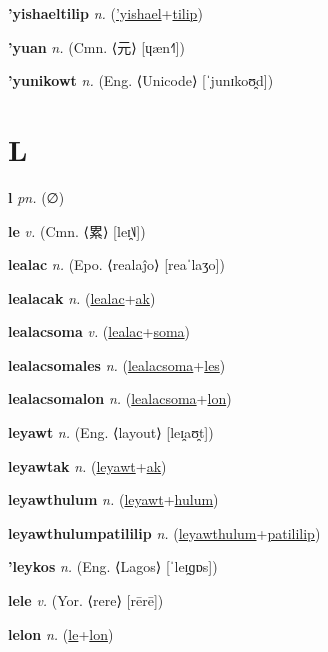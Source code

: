 \textbf{\hypertarget{'yishaeltilip}{'yishaeltilip}} \textit{n.} (\hyperlink{'yishael}{'yishael}+\allowbreak \hyperlink{tilip}{tilip})


\textbf{\hypertarget{'yuan}{'yuan}} \textit{n.} (Cmn. ⟨{\chinese{}元}⟩ [ɥæn˧˥])


\textbf{\hypertarget{'yunikowt}{'yunikowt}} \textit{n.} (Eng. ⟨Unicode⟩ [ˈjunɪkoʊ̯d])


\section{L}

\textbf{\hypertarget{l}{l}} \textit{pn.} (∅)


\textbf{\hypertarget{le}{le}} \textit{v.} (Cmn. ⟨{\chinese{}累}⟩ [leɪ̯˥˩])


\textbf{\hypertarget{lealac}{lealac}} \textit{n.} (Epo. ⟨realaĵo⟩ [reaˈlaʒo])


\textbf{\hypertarget{lealacak}{lealacak}} \textit{n.} (\hyperlink{lealac}{lealac}+\allowbreak \hyperlink{ak}{ak})


\textbf{\hypertarget{lealacsoma}{lealacsoma}} \textit{v.} (\hyperlink{lealac}{lealac}+\allowbreak \hyperlink{soma}{soma})


\textbf{\hypertarget{lealacsomales}{lealacsomales}} \textit{n.} (\hyperlink{lealacsoma}{lealacsoma}+\allowbreak \hyperlink{les}{les})


\textbf{\hypertarget{lealacsomalon}{lealacsomalon}} \textit{n.} (\hyperlink{lealacsoma}{lealacsoma}+\allowbreak \hyperlink{lon}{lon})


\textbf{\hypertarget{leyawt}{leyawt}} \textit{n.} (Eng. ⟨layout⟩ [leɪ̯aʊ̯t])


\textbf{\hypertarget{leyawtak}{leyawtak}} \textit{n.} (\hyperlink{leyawt}{leyawt}+\allowbreak \hyperlink{ak}{ak})


\textbf{\hypertarget{leyawthulum}{leyawthulum}} \textit{n.} (\hyperlink{leyawt}{leyawt}+\allowbreak \hyperlink{hulum}{hulum})


\textbf{\hypertarget{leyawthulumpatililip}{leyawthulumpatililip}} \textit{n.} (\hyperlink{leyawthulum}{leyawthulum}+\allowbreak \hyperlink{patililip}{patililip})


\textbf{\hypertarget{'leykos}{'leykos}} \textit{n.} (Eng. ⟨Lagos⟩ [ˈleɪ̯ɡɒs])


\textbf{\hypertarget{lele}{lele}} \textit{v.} (Yor. ⟨rere⟩ [rērē])


\textbf{\hypertarget{lelon}{lelon}} \textit{n.} (\hyperlink{le}{le}+\allowbreak \hyperlink{lon}{lon})


